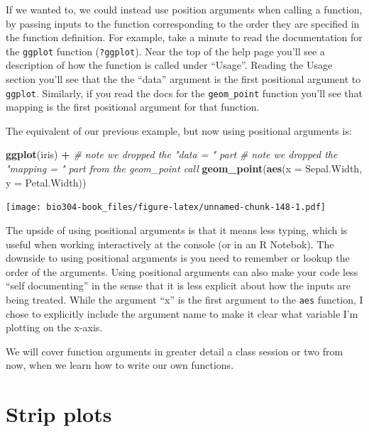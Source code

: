 \documentclass[]{book}
\newenvironment{Shaded}{\begin{snugshade}}{\end{snugshade}}
\newcommand{\CommentTok}[1]{\textcolor[rgb]{0.56,0.35,0.01}{\textit{#1}}}
\newcommand{\DataTypeTok}[1]{\textcolor[rgb]{0.13,0.29,0.53}{#1}}
\newcommand{\KeywordTok}[1]{\textcolor[rgb]{0.13,0.29,0.53}{\textbf{#1}}}
\newcommand{\NormalTok}[1]{#1}
\newcommand{\OperatorTok}[1]{\textcolor[rgb]{0.81,0.36,0.00}{\textbf{#1}}}
\newcommand{\StringTok}[1]{\textcolor[rgb]{0.31,0.60,0.02}{#1}}
\theoremstyle{definition}
\theoremstyle{definition}
\theoremstyle{definition}
\theoremstyle{remark}
\begin{document}
If we wanted to, we could instead use position arguments when calling a
function, by passing inputs to the function corresponding to the order
they are specified in the function definition. For example, take a
minute to read the documentation for the \texttt{ggplot} function
(\texttt{?ggplot}). Near the top of the help page you'll see a
description of how the function is called under ``Usage''. Reading the
Usage section you'll see that the the ``data'' argument is the first
positional argument to \texttt{ggplot}. Similarly, if you read the docs
for the \texttt{geom\_point} function you'll see that mapping is the
first positional argument for that function.

The equivalent of our previous example, but now using positional
arguments is:

\begin{Shaded}
\begin{Highlighting}[]
\KeywordTok{ggplot}\NormalTok{(iris) }\OperatorTok{+}\StringTok{   }\CommentTok{# note we dropped the "data = " part}
\StringTok{  }\CommentTok{# note we dropped the "mapping = " part from the geom_point call}
\StringTok{  }\KeywordTok{geom_point}\NormalTok{(}\KeywordTok{aes}\NormalTok{(}\DataTypeTok{x =}\NormalTok{ Sepal.Width,  }\DataTypeTok{y =}\NormalTok{ Petal.Width))}
\end{Highlighting}
\end{Shaded}

\texttt{[image: bio304-book\_files/figure-latex/unnamed-chunk-148-1.pdf]}

The upside of using positional arguments is that it means less typing,
which is useful when working interactively at the console (or in an R
Notebok). The downside to using positional arguments is you need to
remember or lookup the order of the arguments. Using positional
arguments can also make your code less ``self documenting'' in the sense
that it is less explicit about how the inputs are being treated. While
the argument ``x'' is the first argument to the \texttt{aes} function, I
chose to explicitly include the argument name to make it clear what
variable I'm plotting on the x-axis.

We will cover function arguments in greater detail a class session or
two from now, when we learn how to write our own functions.

\hypertarget{strip-plots}{%
\section{Strip plots}\label{strip-plots}}
\end{document}
